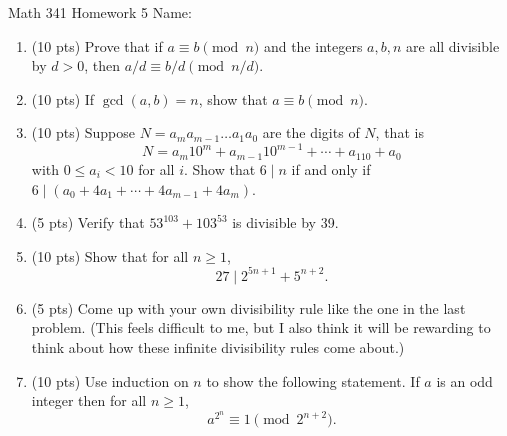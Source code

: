 \documentclass[12pt]{article}
\begin{document}
	Math 341 Homework 5
	\hfill
	Name: \underline{\hspace*{2in}}
	
\begin{enumerate}
	\item  (10 pts) Prove that if $a\equiv b\pmod n$ and the integers $a,b,n$ are all divisible by $d>0$, then $a/d\equiv b/d\pmod{n/d}$.
	\vfill
	\item (10 pts) If $\gcd(a,b)=n$, show that $a\equiv b\pmod n$.
	\vfill 
	\newpage
	\item (10 pts) Suppose $N=a_ma_{m-1}\dots a_1a_0$ are the digits of $N$, that is 
		$$N= a_m10^m+a_{m-1}10^{m-1}+\cdots+a_110+a_0$$ with $0\leq a_i<10$ for all $i$. Show that $6\mid n$ if and only if $6\mid (a_0+4a_1+\cdots + 4a_{m-1}+4a_m)$.
	\vfill
	\item (5 pts) Verify that $53^{103}+103^{53}$ is divisible by 39.
	\vfill
	\newpage
	\item (10 pts) Show that for all $n\geq 1$, 
			$$27\mid 2^{5n+1}+5^{n+2}.$$
	\vfill
	\item (5 pts) Come up with your own divisibility rule like the one in the last problem. (This feels difficult to me, but I also think it will be rewarding to think about how these infinite divisibility rules come about.)
	\vfill
	\newpage
	\item (10 pts) Use induction on $n$ to show the following statement. If $a$ is an odd integer then for all $n\geq 1$, 
			$$a^{2^n}\equiv 1\pmod{2^{n+2}}.$$
\end{enumerate}
		
\end{document}
